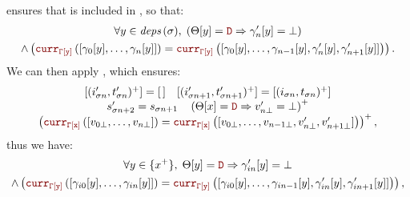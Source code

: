 \begin{skippableproof}
\begin{itemize}
               ensures that
              \depSet{\sigma} is included in , so that:
              \begin{multline*}
                  \forall y \in \depSet{\sigma}, \; \left(\Theta[y] = \dType \Rightarrow \gamma'_n[y] = \bot\right) \\
                  \wedge \left(\CurrVal{\tyCtx[y]}{[\gamma_0[y], \dots, \gamma_n[y]]} = \CurrVal{\tyCtx[y]}{[\gamma_0[y], \dots, \gamma_{n-1}[y], \gamma'_n[y], \gamma'_{n+1}[y]]}\right).
              \end{multline*}
              We can then apply , which ensures:
              \begin{equation*}
                  \begin{array}{c}
                      [(i'_{\sigma n}, t'_{\sigma n})^+] = \emptylist \quad [(i'_{\sigma n+1}, t'_{\sigma n+1})^+] = [(i_{\sigma n}, t_{\sigma n})^+] \\
                      s'_{\sigma n+2} = s_{\sigma n+1} \quad \left(\Theta[x] = \dType \Rightarrow v'_{n\bot} = \bot\right)^+                          \\
                      \left(\CurrVal{\tyCtx[x]}{[v_{0\bot}, \dots, v_{n\bot}]} = \CurrVal{\tyCtx[x]}{[v_{0\bot}, \dots, v_{n-1\bot}, v'_{n\bot}, v'_{n+1\bot}]}\right)^+,
                  \end{array}
              \end{equation*}
              thus we have:
              \begin{multline}\label{eq:semantics:grfrp:theorems:oversampling:stmt:decl:defs}
                  \forall y \in \{x^+\}, \; \Theta[y] = \dType \Rightarrow \gamma'_{in}[y] = \bot \\
                  \wedge \left(\CurrVal{\tyCtx[y]}{[\gamma_{i0}[y], \dots, \gamma_{in}[y]]} = \CurrVal{\tyCtx[y]}{[\gamma_{i0}[y], \dots, \gamma_{in-1}[y], \gamma'_{in}[y], \gamma'_{in+1}[y]]}\right),
              \end{multline}


\end{itemize}
\end{skippableproof}
